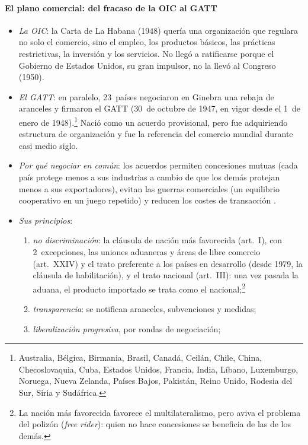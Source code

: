 \documentclass[11pt]{article}
\begin{document}
\paragraph{El plano comercial: del fracaso de la OIC al GATT}

\begin{itemize}
\item \emph{La OIC}: la Carta de La Habana (1948) quería una organización que regulara no solo el comercio, sino el empleo, los productos básicos, las prácticas restrictivas, la inversión y los servicios. No llegó a ratificarse porque el Gobierno de Estados Unidos, su gran impulsor, no la llevó al Congreso (1950).
\item \emph{El GATT}: en paralelo, 23~países negociaron en Ginebra una rebaja de aranceles y firmaron el GATT (30~de octubre de 1947, en vigor desde el 1~de enero de 1948)\nocite{OMC2026GATT}.\footnote{Australia, Bélgica, Birmania, Brasil, Canadá, Ceilán, Chile, China, Checoslovaquia, Cuba, Estados Unidos, Francia, India, Líbano, Luxemburgo, Noruega, Nueva Zelanda, Países Bajos, Pakistán, Reino Unido, Rodesia del Sur, Siria y Sudáfrica.} Nació como un acuerdo provisional, pero fue adquiriendo estructura de organización y fue la referencia del comercio mundial durante casi medio siglo.
\item \emph{Por qué negociar en común}: los acuerdos permiten concesiones mutuas (cada país protege menos a sus industrias a cambio de que los demás protejan menos a sus exportadores), evitan las guerras comerciales (un equilibrio cooperativo en un juego repetido) y reducen los costes de transacción .
\item \emph{Sus principios}:
  \begin{enumerate}
  \item \emph{no discriminación}: la cláusula de nación más favorecida (art.~I), con 2~excepciones, las uniones aduaneras y áreas de libre comercio (art.~XXIV) y el trato preferente a los países en desarrollo (desde 1979, la cláusula de habilitación), y el trato nacional (art.~III): una vez pasada la aduana, el producto importado se trata como el nacional;\footnote{La nación más favorecida favorece el multilateralismo, pero aviva el problema del polizón (\emph{free rider}): quien no hace concesiones se beneficia de las de los demás.}
  \item \emph{transparencia}: se notifican aranceles, subvenciones y medidas;
  \item \emph{liberalización progresiva}, por rondas de negociación;

\end{enumerate}
\end{itemize}
\end{document}
